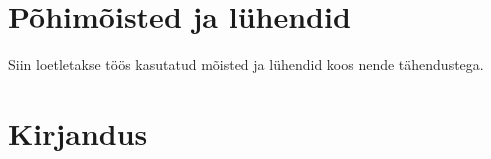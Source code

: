 \documentclass[12pt,a4paper]{article}
\begin{document}
%
%
%
%
%
%
%
%






\newpage
\section{Põhimõisted ja lühendid}
\label{sec:põhimõisted}
Siin loetletakse töös kasutatud mõisted ja lühendid koos nende tähendustega.

\glsaddall
\small{
  \printglossary[title={},toctitle={}]
}








\newpage
\section{Kirjandus}
\label{sec:kirjandus}
{
  \renewcommand*{\bibfont}{\small}
  \printbibliography[heading=none]
}
\end{document}
